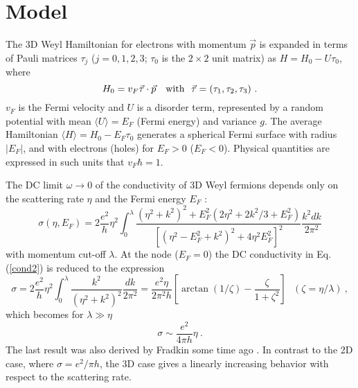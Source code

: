 \documentclass[aps]{revtex4}
\def\beq{\begin{equation}}
\def\eeq{\end{equation}}
\begin{document}
\section{Model}

The 3D Weyl Hamiltonian for electrons with momentum ${\vec p}$ is expanded 
in terms of Pauli matrices $\tau_j$ ($j=0,1,2,3$; $\tau_0$ is the $2\times2$ unit matrix) 
as $H=H_0-U\tau_0$, where %
\beq
H_0=v_F{\vec\tau}\cdot{\vec p}
\ \ \ {\rm with}\ \ {\vec\tau}=(\tau_1,\tau_2,\tau_3)
\ .
\label{ham00}
\eeq
$v_F$ is the Fermi velocity and
$U$ is a disorder term, represented by a random potential with mean $\langle U\rangle=E_F$ (Fermi energy)
and variance $g$. 
The average Hamiltonian $\langle H\rangle=H_0-E_F\tau_0$ 
generates a spherical Fermi surface with radius $|E_F|$, and
with electrons (holes) for $E_F>0$ ($E_F<0$). Physical quantities are expressed in such units that $v_F\hbar=1$.

The DC limit $\omega\to0$ of the conductivity of 3D Weyl fermions depends only on the scattering rate $\eta$ 
and the Fermi energy $E_F$
\cite{ziegler16}:
\beq
\sigma(\eta,E_F)=2\frac{e^2}{h}\eta^2\int_0^\lambda\frac{(\eta^2+k^2)^2+E_F^2(2\eta^2+2k^2/3+E_F^2)}
{[(\eta^2-E_F^2+k^2)^2+4\eta^2E_F^2]^2} \frac{k^2dk}{2\pi^2}
\label{cond2}
\eeq
with momentum cut-off $\lambda$. 
At the node ($E_F=0$) the DC conductivity in Eq. (\ref{cond2}) is reduced to the expression
\beq
\sigma =2\frac{e^2}{h}\eta^2\int_0^\lambda \frac{k^2}{(\eta^2+k^2)^2}\frac{dk}{2\pi^2}
=\frac{e^2\eta}{2\pi^2h}\left[\arctan(1/\zeta)-\frac{\zeta}{1+\zeta^2}\right] \ \ \ 
(\zeta=\eta/\lambda)
\ ,
\label{cond000}
\eeq
which becomes for $\lambda\gg\eta$
\beq
\sigma\sim \frac{ e^2}{4\pi h}\eta
\ .
\label{cond001}
\eeq
The last result was also derived by Fradkin some time ago \cite{fradkin86a}. 
In contrast to the 2D case, where $\sigma=e^2/\pi h$, the 3D case gives a linearly 
increasing behavior with respect to the scattering rate. 
\end{document}
